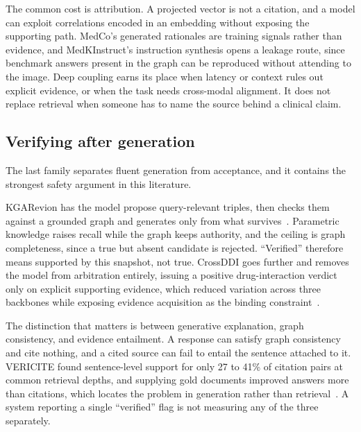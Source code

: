 The common cost is attribution. A projected vector is not a citation, and a model can exploit correlations encoded in an embedding without exposing the supporting path. MedCo's generated rationales are training signals rather than evidence, and MedKInstruct's instruction synthesis opens a leakage route, since benchmark answers present in the graph can be reproduced without attending to the image. Deep coupling earns its place when latency or context rules out explicit evidence, or when the task needs cross-modal alignment. It does not replace retrieval when someone has to name the source behind a clinical claim.

\subsection{Verifying after generation}

The last family separates fluent generation from acceptance, and it contains the strongest safety argument in this literature.

KGARevion has the model propose query-relevant triples, then checks them against a grounded graph and generates only from what survives~\cite{su2025kgarevion}. Parametric knowledge raises recall while the graph keeps authority, and the ceiling is graph completeness, since a true but absent candidate is rejected. ``Verified'' therefore means supported by this snapshot, not true. CrossDDI goes further and removes the model from arbitration entirely, issuing a positive drug-interaction verdict only on explicit supporting evidence, which reduced variation across three backbones while exposing evidence acquisition as the binding constraint~\cite{wang2026crossddi}.

The distinction that matters is between generative explanation, graph consistency, and evidence entailment. A response can satisfy graph consistency and cite nothing, and a cited source can fail to entail the sentence attached to it. VERICITE found sentence-level support for only 27 to 41\% of citation pairs at common retrieval depths, and supplying gold documents improved answers more than citations, which locates the problem in generation rather than retrieval~\cite{ma2026vericite}. A system reporting a single ``verified'' flag is not measuring any of the three separately.
